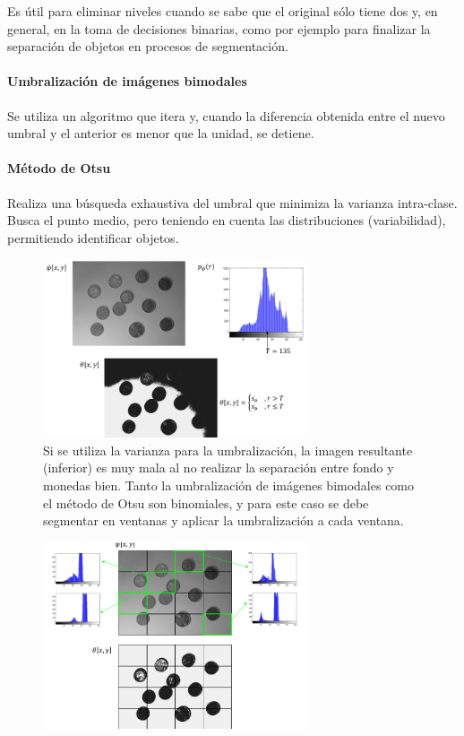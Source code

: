 Es útil para eliminar niveles cuando se sabe que el original sólo tiene dos y, en general, en la toma de decisiones binarias, como por ejemplo para finalizar la separación de objetos en procesos de segmentación.

\paragraph{Umbralización de imágenes bimodales}
Se utiliza un algoritmo que itera y, cuando la diferencia obtenida entre el nuevo umbral y el anterior es menor que la unidad, se detiene.

\paragraph{Método de Otsu}
Realiza una búsqueda exhaustiva del umbral que minimiza la varianza intra-clase. Busca el punto medio, pero teniendo en cuenta las distribuciones (variabilidad), permitiendo identificar objetos. 

\begin{figure}[h]
\centering
\includegraphics[width = 0.7\textwidth]{figs/umbralizacion-ej.png}
\caption{Si se utiliza la varianza para la umbralización, la imagen resultante (inferior) es muy mala al no realizar la separación entre fondo y monedas bien. Tanto la umbralización de imágenes bimodales como el método de Otsu son binomiales, y para este caso se debe segmentar en ventanas y aplicar la umbralización a cada ventana.}
\end{figure}

\begin{figure}[h]
\centering
\includegraphics[width = 0.7\textwidth]{figs/umbralizacion-ej2.png}
\end{figure}

